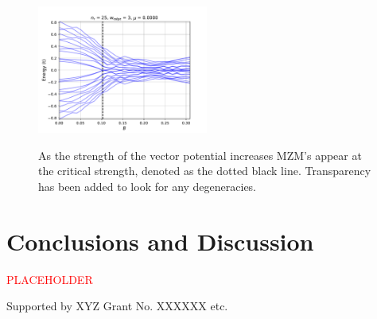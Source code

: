 \documentclass[aps,prb,showpacs,twocolumn,amsmath,amssymb,superscriptaddress]{revtex4-2}
\newcommand{\Red}[1]{\textcolor{red}{#1}}
\begin{document}
\begin{figure}[]
\includegraphics[width=0.5\textwidth]{./figures/nr-25-w-3-spectral-flow.pdf}
\label{fig: finite-width-triangle-spectral}
\caption{As the strength of the vector potential increases MZM's appear at the critical strength, denoted as the dotted black line. Transparency has been added to look for any degeneracies.}
\end{figure}

\section{Conclusions and Discussion}

\Red{PLACEHOLDER}


\begin{acknowledgements}
  Supported by XYZ Grant No. XXXXXX etc.
\end{acknowledgements}


%
\end{document}
